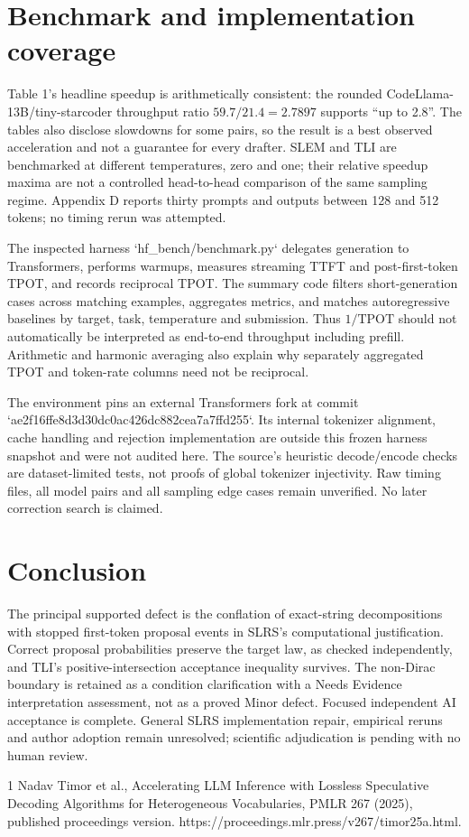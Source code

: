 \documentclass[10pt]{article}
\begin{document}
\section*{Benchmark and implementation coverage}
Table 1’s headline speedup is arithmetically consistent: the rounded CodeLlama-13B/tiny-starcoder throughput ratio \(59.7/21.4=2.7897\) supports “up to 2.8”. The tables also disclose slowdowns for some pairs, so the result is a best observed acceleration and not a guarantee for every drafter. SLEM and TLI are benchmarked at different temperatures, zero and one; their relative speedup maxima are not a controlled head-to-head comparison of the same sampling regime. Appendix D reports thirty prompts and outputs between 128 and 512 tokens; no timing rerun was attempted.\par
The inspected harness `hf\_bench/benchmark.py` delegates generation to Transformers, performs warmups, measures streaming TTFT and post-first-token TPOT, and records reciprocal TPOT. The summary code filters short-generation cases across matching examples, aggregates metrics, and matches autoregressive baselines by target, task, temperature and submission. Thus \(1/\mathrm{TPOT}\) should not automatically be interpreted as end-to-end throughput including prefill. Arithmetic and harmonic averaging also explain why separately aggregated TPOT and token-rate columns need not be reciprocal.\par
The environment pins an external Transformers fork at commit `ae2f16ffe8d3d30dc0ac426dc882cea7a7ffd255`. Its internal tokenizer alignment, cache handling and rejection implementation are outside this frozen harness snapshot and were not audited here. The source’s heuristic decode/encode checks are dataset-limited tests, not proofs of global tokenizer injectivity. Raw timing files, all model pairs and all sampling edge cases remain unverified. No later correction search is claimed.\par
\section*{Conclusion}
The principal supported defect is the conflation of exact-string decompositions with stopped first-token proposal events in SLRS’s computational justification. Correct proposal probabilities preserve the target law, as checked independently, and TLI’s positive-intersection acceptance inequality survives. The non-Dirac boundary is retained as a condition clarification with a Needs Evidence interpretation assessment, not as a proved Minor defect. Focused independent AI acceptance is complete. General SLRS implementation repair, empirical reruns and author adoption remain unresolved; scientific adjudication is pending with no human review.\par
1 Nadav Timor et al., Accelerating LLM Inference with Lossless Speculative Decoding Algorithms for Heterogeneous Vocabularies, PMLR 267 (2025), published proceedings version. https://proceedings.mlr.press/v267/timor25a.html.\par
\end{document}
